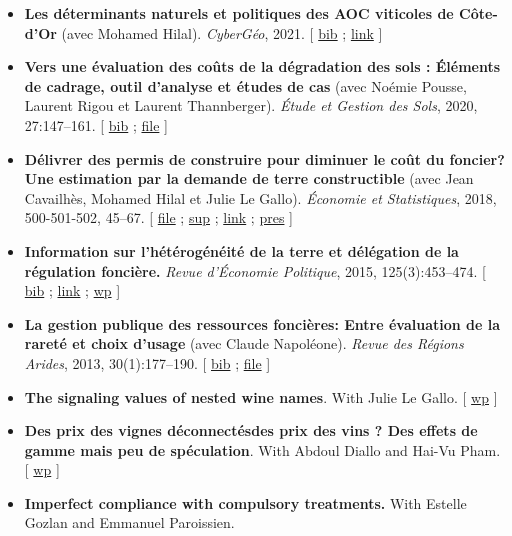 \documentclass[11pt, a4paper]{./style}
\begin{document}
\label{sec:org22f72de}

\begin{itemize}
\item \textbf{Les déterminants naturels et politiques des AOC viticoles de
Côte-d’Or} (avec Mohamed Hilal). \emph{CyberGéo}, 2021. [ \href{bib/DNPA.bib}{bib} ; \href{https://journals.openedition.org/cybergeo/36443\#authors}{link} ]
\item \textbf{Vers une évaluation des coûts de la dégradation des sols :
Éléments de cadrage, outil d'analyse et études de cas} (avec
Noémie Pousse, Laurent Rigou et Laurent Thannberger). \emph{Étude et
Gestion des Sols}, 2020, 27:147--161. [ \href{bib/GPRF.bib}{bib} ; \href{doc/ECOSOL-FILE.pdf}{file} ]
\item \textbf{Délivrer des permis de construire pour diminuer le coût du
foncier? Une estimation par la demande de terre constructible}
(avec Jean Cavailhès, Mohamed Hilal et Julie Le Gallo).
\emph{Économie et Statistiques}, 2018, 500-501-502, 45--67. [ \href{doc/PCPXf-FILE.pdf}{file} ;
\href{doc/PCPX-SUP.pdf}{sup} ; \href{https://insee.fr/fr/statistiques/3621977?sommaire=3622116}{link} ; \href{doc/PCPXf-PRES.pdf}{pres} ]
\item \textbf{Information sur l'hétérogénéité de la terre et délégation de la
régulation foncière.} \emph{Revue d'Économie Politique}, 2015,
125(3):453--474. [ \href{bib/IFHT.bib}{bib} ; \href{https://www.cairn.info/revue-d-economie-politique-2015-3-page-453.htm}{link} ; \href{http://ideas.repec.org/p/ceo/wpaper/32.html}{wp} ]
\item \textbf{La gestion publique des ressources foncières: Entre évaluation
de la rareté et choix d'usage} (avec Claude Napoléone). \emph{Revue
des Régions Arides}, 2013, 30(1):177--190. [ \href{bib/GPRF.bib}{bib} ; \href{https://www.researchgate.net/profile/Claude\_Napoleone/publication/268075060\_La\_gestion\_publique\_des\_ressources\_foncieres\_entre\_evaluation\_de\_la\_rarete\_et\_choix\_d'usages/links/5460bdd20cf295b5616376de/La-gestion-publique-des-ressources-foncieres-entre-evaluation-de-la-rarete-et-choix-dusages.pdf}{file} ]
\end{itemize}

\label{sec:org37d5af5}

\begin{itemize}
\item \textbf{The signaling values of nested wine names}. With Julie Le
Gallo. [ \href{https://wine-economics.org/wp-content/uploads/2021/05/AAWE\_WP265.pdf}{wp} ]
\item \textbf{Des prix des vignes déconnectésdes prix des vins ? Des effets de
gamme mais peu de spéculation}. With Abdoul Diallo and Hai-Vu
Pham. [ \href{https://www2.dijon.inrae.fr/cesaer/wp-content/uploads/2021/05/WP\_AY\_DIALLO\_PHAM.pdf}{wp} ]
\item \textbf{Imperfect compliance with compulsory treatments.} With Estelle
Gozlan and Emmanuel Paroissien.
\end{itemize}
\end{document}
